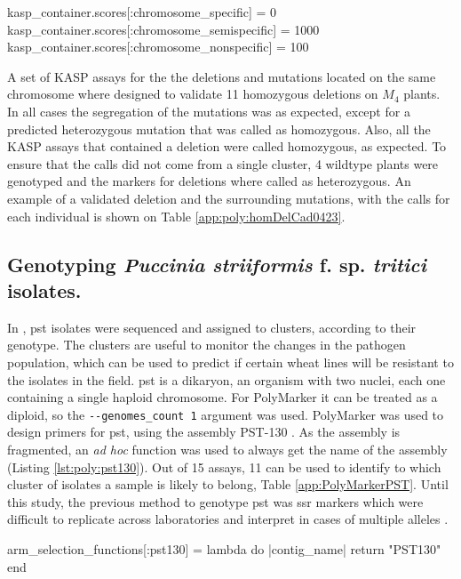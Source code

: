 \begin{code}[language=Ruby,caption=Score values to select semi-specifc primers, label=lst:poly:delsScore]
kasp_container.scores[:chromosome_specific] = 0
kasp_container.scores[:chromosome_semispecific] = 1000
kasp_container.scores[:chromosome_nonspecific] = 100    
\end{code}

A set of KASP assays for the the deletions and mutations located on the same chromosome where designed to validate 11 homozygous deletions on $M_{4}$ plants. 
In all cases the segregation of the mutations was as expected, except for a predicted heterozygous mutation that was called as homozygous. 
Also, all the KASP assays that contained a deletion were called homozygous, as expected. 
To ensure that the calls did not come from a single cluster, 4 wildtype plants were genotyped and the markers for deletions where called as heterozygous. 
An example of a validated deletion and the surrounding mutations, with the calls for each individual is shown on Table \ref{app:poly:homDelCad0423}. 
  



\subsection{Genotyping \textit{Puccinia 
striiformis} f. sp. \textit{tritici} isolates.}
In \cite{Hubbard2015}, \gls{pst} isolates were sequenced and assigned to clusters, according to their genotype.
The clusters are useful to monitor the changes in the pathogen population, which can be used to predict if certain wheat lines will be resistant to the isolates in the field. 
\gls{pst} is a dikaryon, an organism with two nuclei, each one containing a single haploid chromosome.
For PolyMarker it can be treated as a diploid, so the \verb|--genomes_count 1| argument was used.
PolyMarker was used to design primers for \gls{pst}, using the assembly PST-130 \citep{Cantu2011}.
As the assembly is fragmented, an \textit{ad hoc} function was used to always get the name of the assembly (Listing \ref{lst:poly:pst130}). 
Out of 15 assays, 11 can be used to identify to which cluster of isolates a sample is likely to belong, Table \ref{app:PolyMarkerPST}.
Until this study, the previous method to genotype \gls{pst} was \gls{ssr} markers which were difficult to replicate across laboratories and interpret in cases of multiple alleles \citep{Ali2014}.

\begin{code}[language=Ruby,caption=Function that always returns PST130 as chromosome, label=lst:poly:pst130]
arm_selection_functions[:pst130] = lambda do |contig_name|       
  return "PST130"
end
\end{code}

